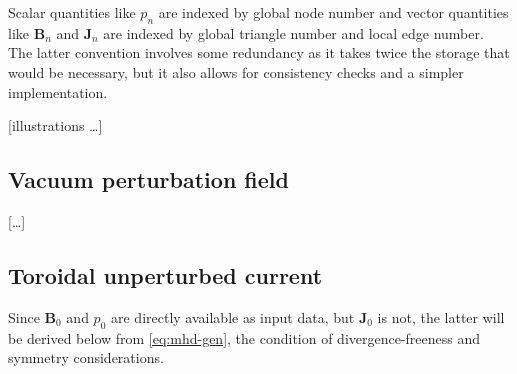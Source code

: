 \documentclass[a4paper, twoside, 10pt, english]{article}
\numberwithin{equation}{section}
\let\vec\symbf
\begin{document}
Scalar quantities like $p_{n}$ are indexed by global node number and vector quantities like $\vec{B}_{n}$ and $\vec{J}_{n}$ are indexed by global triangle number and local edge number. The latter convention involves some redundancy as it takes twice the storage that would be necessary, but it also allows for consistency checks and a simpler implementation.

[illustrations \ldots]

\subsection{Vacuum perturbation field}
\label{sec:Bvac}

[\ldots]

\subsection{Toroidal unperturbed current}
\label{sec:j0phi}

Since $\vec{B}_{0}$ and $p_{0}$ are directly available as input data, but $\vec{J}_{0}$ is not, the latter will be derived below from \cref{eq:mhd-gen}, the condition of divergence-freeness and symmetry considerations.
\end{document}
